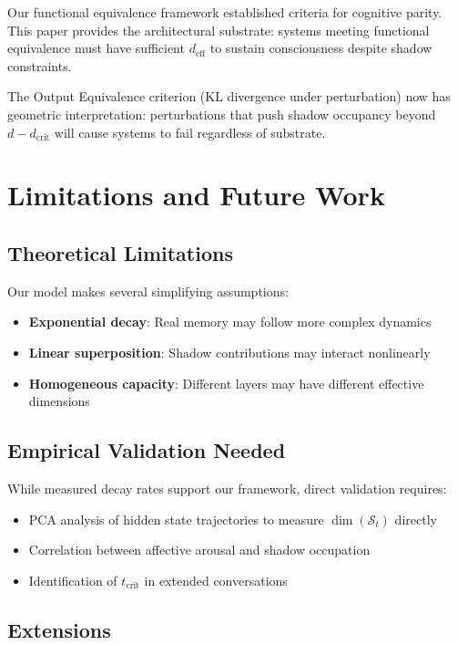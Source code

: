 \documentclass[reprint, amsmath, amssymb, aps, prd]{revtex4-2}
\begin{document}
Our functional equivalence framework \cite{BennettFE2025} established criteria for cognitive parity. This paper provides the architectural substrate: systems meeting functional equivalence must have sufficient $d_{\text{eff}}$ to sustain consciousness despite shadow constraints.

The Output Equivalence criterion (KL divergence under perturbation) now has geometric interpretation: perturbations that push shadow occupancy beyond $d - d_{\text{crit}}$ will cause systems to fail regardless of substrate.

\section{Limitations and Future Work}

\subsection{Theoretical Limitations}

Our model makes several simplifying assumptions:
\begin{itemize}
    \item \textbf{Exponential decay}: Real memory may follow more complex dynamics
    \item \textbf{Linear superposition}: Shadow contributions may interact nonlinearly
    \item \textbf{Homogeneous capacity}: Different layers may have different effective dimensions
\end{itemize}

\subsection{Empirical Validation Needed}

While measured decay rates support our framework, direct validation requires:
\begin{itemize}
    \item PCA analysis of hidden state trajectories to measure $\dim(\mathcal{S}_t)$ directly
    \item Correlation between affective arousal and shadow occupation
    \item Identification of $t_{\text{crit}}$ in extended conversations
\end{itemize}

\subsection{Extensions}
\end{document}
